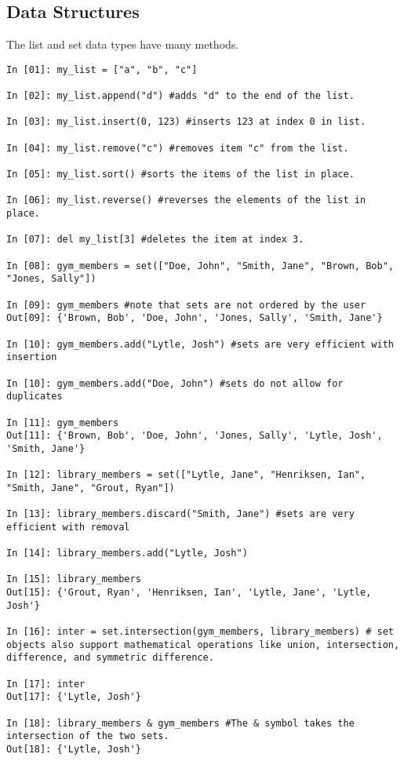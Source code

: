 \subsection*{Data Structures}
\begin{example}
The list and set data types have many methods. 
\begin{lstlisting}
In [01]: my_list = ["a", "b", "c"]

In [02]: my_list.append("d") #adds "d" to the end of the list.

In [03]: my_list.insert(0, 123) #inserts 123 at index 0 in list.

In [04]: my_list.remove("c") #removes item "c" from the list.

In [05]: my_list.sort() #sorts the items of the list in place.

In [06]: my_list.reverse() #reverses the elements of the list in place. 

In [07]: del my_list[3] #deletes the item at index 3.

In [08]: gym_members = set(["Doe, John", "Smith, Jane", "Brown, Bob", "Jones, Sally"])

In [09]: gym_members #note that sets are not ordered by the user
Out[09]: {'Brown, Bob', 'Doe, John', 'Jones, Sally', 'Smith, Jane'}

In [10]: gym_members.add("Lytle, Josh") #sets are very efficient with insertion

In [10]: gym_members.add("Doe, John") #sets do not allow for duplicates

In [11]: gym_members
Out[11]: {'Brown, Bob', 'Doe, John', 'Jones, Sally', 'Lytle, Josh', 'Smith, Jane'}

In [12]: library_members = set(["Lytle, Jane", "Henriksen, Ian", "Smith, Jane", "Grout, Ryan"])

In [13]: library_members.discard("Smith, Jane") #sets are very efficient with removal

In [14]: library_members.add("Lytle, Josh") 

In [15]: library_members
Out[15]: {'Grout, Ryan', 'Henriksen, Ian', 'Lytle, Jane', 'Lytle, Josh'}

In [16]: inter = set.intersection(gym_members, library_members) # set objects also support mathematical operations like union, intersection, difference, and symmetric difference.

In [17]: inter
Out[17]: {'Lytle, Josh'}

In [18]: library_members & gym_members #The & symbol takes the intersection of the two sets.
Out[18]: {'Lytle, Josh'}



\end{lstlisting}

\end{example}



